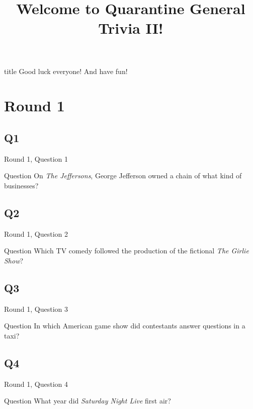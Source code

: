 \documentclass[11pt]{beamer}
\begin{document}
\title{Welcome to Quarantine General Trivia II!\vspace{-0.5in}}
\date{}

\begin{frame}
\titlepage{}
\end{frame}

\begingroup{}
\begin{frame}
\vfill{}
\begin{beamercolorbox}[sep=8pt,center,shadow=true,rounded=true]{title}
Good luck everyone! And have fun!
\end{beamercolorbox}
\vfill{}
\end{frame}
\endgroup{}
\def\thisSectionName{TV}
\section{Round 1}
\subsection*{Q1}
\begin{frame}[t]{Round 1, Question 1}
\begin{block}{Question}
On \emph{The Jeffersons}, George Jefferson owned a chain of what kind of businesses?
\end{block}
\end{frame}
\subsection*{Q2}
\begin{frame}[t]{Round 1, Question 2}
\begin{block}{Question}
Which TV comedy followed the production of the fictional \emph{The Girlie Show}?
\end{block}
\end{frame}
\subsection*{Q3}
\begin{frame}[t]{Round 1, Question 3}
\begin{block}{Question}
In which American game show did contestants answer questions in a taxi?
\end{block}
\end{frame}
\subsection*{Q4}
\begin{frame}[t]{Round 1, Question 4}
\begin{block}{Question}
What year did \emph{Saturday Night Live} first air?
\end{block}
\end{frame}
\end{document}
